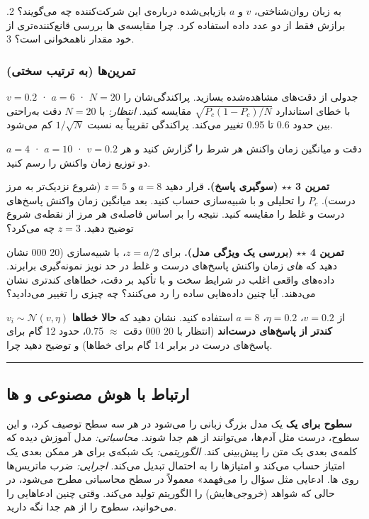 به زبان روان‌شناختی، \(v\) و \(a\) بازیابی‌شده درباره‌ی این شرکت‌کننده چه
می‌گویند؟ 2. برازش فقط از دو عدد داده استفاده کرد. چرا مقایسه‌ی
ها بررسی قانع‌کننده‌تری از خود مقدار ناهمخوانی
 است؟ 3.

\subsubsection{تمرین‌ها (به ترتیب سختی)}

\(v = 0.2\) · \(a = 6\) · \(N = 20\) جدولی از دقت‌های مشاهده‌شده بسازید.
پراکندگی‌شان را با خطای استاندارد \(\sqrt{P_c(1-P_c)/N}\) مقایسه کنید.
\emph{انتظار:} با \(N = 20\) دقت به‌راحتی بین حدود 0.6 تا 0.95 تغییر
می‌کند. پراکندگی تقریباً به نسبت \(1/\sqrt{N}\) کم می‌شود.

\(a = 4\) · \(a = 10\) · \(v = 0.2\) دقت و میانگین زمان واکنش هر شرط را
گزارش کنید و هر دو توزیع زمان واکنش را رسم کنید.

\textbf{تمرین 3 \ensuremath{\star}\ensuremath{\star} (سوگیری پاسخ).} قرار دهید \(a = 8\) و \(z = 5\) (شروع
نزدیک‌تر به مرز درست). \(P_c\) را تحلیلی و با شبیه‌سازی حساب کنید. بعد
میانگین زمان واکنش پاسخ‌های درست و غلط را مقایسه کنید. نتیجه را بر اساس
فاصله‌ی هر مرز از نقطه‌ی شروع توضیح دهید. \(z = 3\) چه می‌کرد؟

\textbf{تمرین 4 \ensuremath{\star}\ensuremath{\star} (بررسی یک ویژگی مدل).} برای \(z = a/2\)، با شبیه‌سازی
(20 000  نشان دهید که \emph{های} زمان واکنش
پاسخ‌های درست و غلط در حد نویز نمونه‌گیری برابرند. داده‌های واقعی اغلب در
شرایط سخت و با تأکید بر دقت، خطاهای کندتری نشان می‌دهند. آیا چنین
داده‌هایی  ساده را رد می‌کنند؟ چه چیزی را تغییر می‌دادید؟

\(v_i \sim \mathcal{N}(v, \eta)\) از \(v = 0.2\)، \(\eta = 0.2\)،
\(a = 8\) استفاده کنید. نشان دهید که \textbf{حالا خطاها کندتر از پاسخ‌های
درست‌اند} (انتظار با 20 000  دقت \ensuremath{\approx} 0.75، حدود 12 گام برای
پاسخ‌های درست در برابر 14 گام برای خطاها) و توضیح دهید چرا.

\begin{center}\rule{0.5\linewidth}{0.5pt}\end{center}

\subsection{\texorpdfstring{ارتباط با هوش مصنوعی و
ها}{ارتباط با هوش مصنوعی و LLMها}}

\textbf{سطوح  برای یک } یک مدل بزرگ زبانی
 را می‌شود در هر سه سطح  توصیف کرد، و این سطوح، درست
مثل آدم‌ها، می‌توانند از هم جدا شوند. \emph{محاسباتی:} مدل آموزش دیده که
کلمه‌ی  بعدی یک متن را پیش‌بینی کند. \emph{الگوریتمی:} یک
شبکه‌ی  برای هر  ممکن بعدی یک امتیاز
 حساب می‌کند و امتیازها را به احتمال تبدیل می‌کند.
\emph{اجرایی:} ضرب ماتریس‌ها روی ها. ادعایی مثل  سؤال را
می‌فهمد» معمولاً در سطح محاسباتی مطرح می‌شود، در حالی که شواهد (خروجی‌هایش)
را الگوریتم تولید می‌کند. وقتی چنین ادعاهایی را می‌خوانید، سطوح را از هم
جدا نگه دارید.


